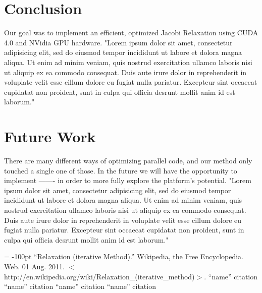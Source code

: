 \documentclass[11pt, twocolumn]{article}
\begin{document}
\section{Conclusion} %
Our goal was to implement an efficient, optimized Jacobi Relaxation using CUDA 4.0 and NVidia GPU hardware.
"Lorem ipsum dolor sit amet, consectetur adipisicing elit, sed do eiusmod tempor incididunt ut labore et dolora magna aliqua.  Ut enim ad minim veniam, quis nostrud exercitation ullamco laboris nisi ut aliquip ex ea commodo consequat.  Duis aute irure dolor in reprehenderit in voluplate velit esse cillum dolore eu fugiat nulla pariatur.  Excepteur sint occaecat cupidatat non proident, sunt in culpa qui officia desrunt mollit anim id est laborum."

\section{Future Work} %
There are many different ways of optimizing parallel code, and our method only touched a single one of those.
In the future we will have the opportunity to implement ------- in order to more fully explore the platform's potential.
"Lorem ipsum dolor sit amet, consectetur adipisicing elit, sed do eiusmod tempor incididunt ut labore et dolora magna aliqua.  Ut enim ad minim veniam, quis nostrud exercitation ullamco laboris nisi ut aliquip ex ea commodo consequat.  Duis aute irure dolor in reprehenderit in voluplate velit esse cillum dolore eu fugiat nulla pariatur.  Excepteur sint occaecat cupidatat non proident, sunt in culpa qui officia desrunt mollit anim id est laborum."

\begin{flushleft}
\begin{thebibliography}{99}
\topmargin = -100pt
    ``Relaxation (iterative Method).''
        Wikipedia, the Free Encyclopedia. Web. 01 Aug. 2011. $<$http://en.wikipedia.org/wiki/Relaxation\_(iterative\_method)$>$.
    ``name''
        citation
    ``name''
        citation
    ``name''
        citation
    ``name''
        citation
\end{thebibliography}
\end{flushleft}
\end{document}
